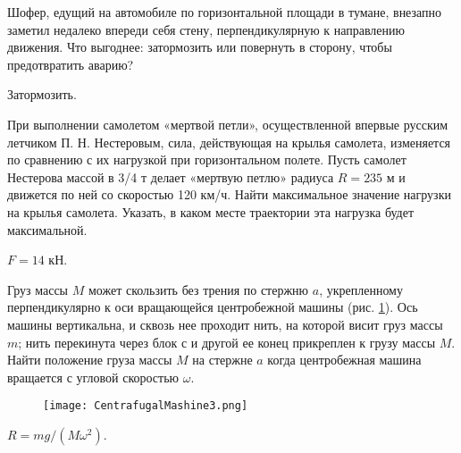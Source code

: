 \begin{ex} %
Шофер, едущий на автомобиле по горизонтальной площади в тумане, внезапно заметил недалеко впереди себя стену, перпендикулярную к направлению движения. Что выгоднее: затормозить или повернуть в сторону, чтобы предотвратить аварию?
\begin{ans}
Затормозить.
\end{ans}
\end{ex}	

\begin{ex} %
При выполнении самолетом «мертвой петли», осуществленной впервые русским летчиком П. Н. Нестеровым, сила, действующая на крылья самолета, изменяется по сравнению с их нагрузкой при горизонтальном полете. Пусть самолет Нестерова массой в 3/4 т делает «мертвую петлю» радиуса $R = 235$ м и движется по ней со скоростью 120 км/ч. Найти максимальное значение нагрузки на крылья самолета. Указать, в каком месте траектории эта нагрузка будет максимальной.
\begin{ans}
$F = 14$ кН.
\end{ans}
\end{ex}	

\begin{ex} %
Груз массы $M$ может скользить без трения по стержню $a$, укрепленному перпендикулярно к оси вращающейся центробежной машины (рис. \ref{CentrafugalMashine3}). Ось машины вертикальна, и сквозь нее проходит нить, на которой висит груз массы $m$; нить перекинута через блок с и другой ее конец прикреплен к грузу массы $M$. Найти положение груза массы $M$ на стержне $a$ когда центробежная машина вращается с угловой скоростью $\omega$.

\begin{figure}[h]
\centering
\texttt{[image: CentrafugalMashine3.png]}
\caption{}
\label{CentrafugalMashine3}
\end{figure}

\begin{ans}
$R = mg/(M\omega^2)$.
\end{ans}
\end{ex}	



\clearpage